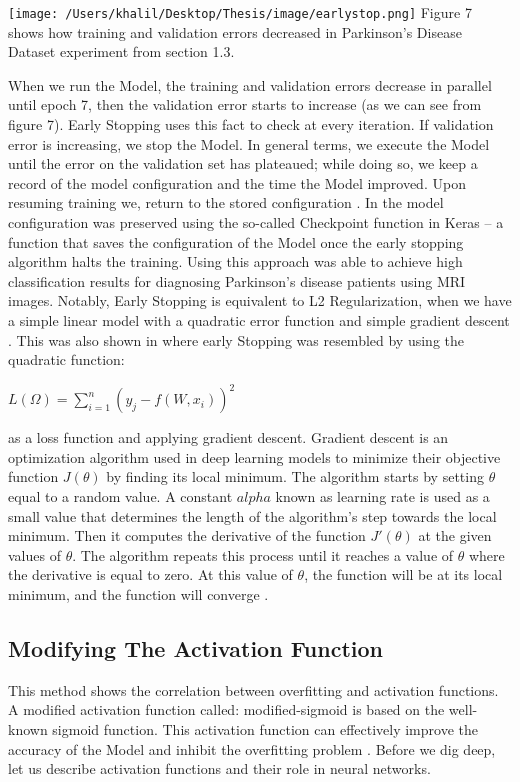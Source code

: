 \documentclass[oneside,12pt,article]{article}
\begin{document}
\begin{center}
\texttt{[image: /Users/khalil/Desktop/Thesis/image/earlystop.png]} 
\newline
Figure 7 shows how training and validation errors decreased in Parkinson's Disease Dataset experiment from section 1.3. 
\end{center}When we run the Model, the training and validation errors decrease in parallel until epoch 7, then the validation error starts to increase (as we can see from figure 7). Early Stopping uses this fact to check at every iteration. If validation error is increasing, we stop the Model. In general terms, we execute the Model until the error on the validation set has plateaued; while doing so, we keep a record of the model configuration and the time the Model improved. Upon resuming training we, return to the stored configuration \cite{bengio2017deep}. In \cite{basnin2021deep} the model configuration was preserved using the so-called Checkpoint function in Keras ­– a function that saves the configuration of the Model once the early stopping algorithm halts the training. Using this approach \cite{basnin2021deep} was able to achieve high classification results for diagnosing Parkinson's disease patients using MRI images. Notably, Early Stopping is equivalent to L2 Regularization, when we have a simple linear model with a quadratic error function and simple gradient descent \cite{bengio2017deep}. This was also shown in \cite{li2020gradient} where early Stopping was resembled by using the quadratic function:
\begin{center}
$L(\Omega) = \sum_{i=1}^{n}(y_j - f(W,x_i))^2$
\end{center}
as a loss function and applying gradient descent. Gradient descent is an optimization algorithm used in deep learning models to minimize their objective function $J(\theta)$ by finding its local minimum. The algorithm starts by setting $\theta$ equal to a random value. A constant $alpha$ known as learning rate is used as a small value that determines the length of the algorithm's step towards the local minimum. Then it computes the derivative of the function $J' (\theta)$ at the given values of $\theta$. The algorithm repeats this process until it reaches a value of $\theta$ where the derivative is equal to zero. At this value of $\theta$, the function will be at its local minimum, and the function will converge \cite{bengio2017deep}\cite{ruder2016overview}.   


\subsection{Modifying The Activation Function}
This method shows the correlation between overfitting and activation functions. A modified activation function called: modified-sigmoid is based on the well-known sigmoid function. This activation
function can effectively improve the accuracy of the Model and inhibit the overfitting problem \cite{li2019research}. Before we dig deep, let us describe activation functions and their role in neural networks.  
\end{document}
